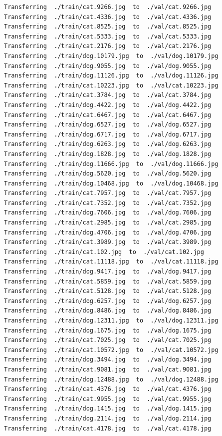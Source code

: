 \documentclass[]{book}
\theoremstyle{definition}
\theoremstyle{definition}
\theoremstyle{definition}
\theoremstyle{remark}
\begin{document}
\begin{verbatim}
Transferring  ./train/cat.9266.jpg  to  ./val/cat.9266.jpg
Transferring  ./train/cat.4336.jpg  to  ./val/cat.4336.jpg
Transferring  ./train/cat.8525.jpg  to  ./val/cat.8525.jpg
Transferring  ./train/cat.5333.jpg  to  ./val/cat.5333.jpg
Transferring  ./train/cat.2176.jpg  to  ./val/cat.2176.jpg
Transferring  ./train/dog.10179.jpg  to  ./val/dog.10179.jpg
Transferring  ./train/dog.9055.jpg  to  ./val/dog.9055.jpg
Transferring  ./train/dog.11126.jpg  to  ./val/dog.11126.jpg
Transferring  ./train/cat.10223.jpg  to  ./val/cat.10223.jpg
Transferring  ./train/cat.3784.jpg  to  ./val/cat.3784.jpg
Transferring  ./train/dog.4422.jpg  to  ./val/dog.4422.jpg
Transferring  ./train/cat.6467.jpg  to  ./val/cat.6467.jpg
Transferring  ./train/dog.6527.jpg  to  ./val/dog.6527.jpg
Transferring  ./train/dog.6717.jpg  to  ./val/dog.6717.jpg
Transferring  ./train/dog.6263.jpg  to  ./val/dog.6263.jpg
Transferring  ./train/dog.1828.jpg  to  ./val/dog.1828.jpg
Transferring  ./train/dog.11666.jpg  to  ./val/dog.11666.jpg
Transferring  ./train/dog.5620.jpg  to  ./val/dog.5620.jpg
Transferring  ./train/dog.10468.jpg  to  ./val/dog.10468.jpg
Transferring  ./train/cat.7957.jpg  to  ./val/cat.7957.jpg
Transferring  ./train/cat.7352.jpg  to  ./val/cat.7352.jpg
Transferring  ./train/dog.7606.jpg  to  ./val/dog.7606.jpg
Transferring  ./train/cat.2985.jpg  to  ./val/cat.2985.jpg
Transferring  ./train/dog.4706.jpg  to  ./val/dog.4706.jpg
Transferring  ./train/cat.3989.jpg  to  ./val/cat.3989.jpg
Transferring  ./train/cat.102.jpg  to  ./val/cat.102.jpg
Transferring  ./train/cat.11118.jpg  to  ./val/cat.11118.jpg
Transferring  ./train/dog.9417.jpg  to  ./val/dog.9417.jpg
Transferring  ./train/cat.5859.jpg  to  ./val/cat.5859.jpg
Transferring  ./train/cat.5128.jpg  to  ./val/cat.5128.jpg
Transferring  ./train/dog.6257.jpg  to  ./val/dog.6257.jpg
Transferring  ./train/dog.8486.jpg  to  ./val/dog.8486.jpg
Transferring  ./train/dog.12311.jpg  to  ./val/dog.12311.jpg
Transferring  ./train/dog.1675.jpg  to  ./val/dog.1675.jpg
Transferring  ./train/cat.7025.jpg  to  ./val/cat.7025.jpg
Transferring  ./train/cat.10572.jpg  to  ./val/cat.10572.jpg
Transferring  ./train/dog.3494.jpg  to  ./val/dog.3494.jpg
Transferring  ./train/cat.9081.jpg  to  ./val/cat.9081.jpg
Transferring  ./train/dog.12488.jpg  to  ./val/dog.12488.jpg
Transferring  ./train/cat.4376.jpg  to  ./val/cat.4376.jpg
Transferring  ./train/cat.9955.jpg  to  ./val/cat.9955.jpg
Transferring  ./train/dog.1415.jpg  to  ./val/dog.1415.jpg
Transferring  ./train/dog.2114.jpg  to  ./val/dog.2114.jpg
Transferring  ./train/cat.4178.jpg  to  ./val/cat.4178.jpg

\end{verbatim}
\end{document}
